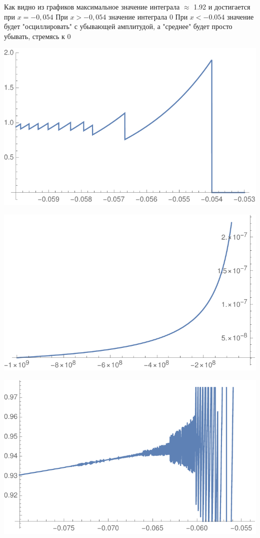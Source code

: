\documentclass[a4paper,14pt]{article}
\begin{document}
Как видно из графиков максимальное значение интеграла $\approx$ 1.92 и достигается при $x=-0,054$
При $x>-0,054$ значение интеграла 0
При $x<-0.054$ значение будет "осциллировать" с убывающей амплитудой, а "среднее" будет просто убывать, стремясь к 0 
\begin{center}
\includegraphics{gr1}
\end{center}

\begin{center}
\includegraphics{gr2}
\end{center}

\begin{center}
\includegraphics{gr3}
\end{center}
\end{document}
